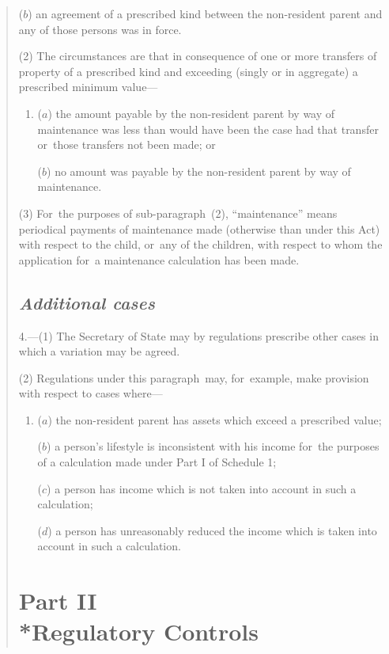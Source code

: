 \documentclass[12pt,a4paper]{article}
\begin{document}
\begin{quotation}
\begin{enumerate}
($b$) an agreement of a prescribed kind between the non-resident parent and any of those persons was in force.
\end{enumerate}

(2) The circumstances are that in consequence of one or more transfers of property of a prescribed kind and exceeding (singly or in aggregate) a prescribed minimum value—
\begin{enumerate}\item[]
($a$) the amount payable by the non-resident parent by way of maintenance was less than would have been the case had that transfer or~those transfers not been made; or

($b$) no amount was payable by the non-resident parent by way of maintenance.
\end{enumerate}

(3) For~the purposes of sub-paragraph~(2), “maintenance” means periodical payments of maintenance made (otherwise than under this Act) with respect to the child, or~any of the children, with respect to whom the application for~a maintenance calculation has been made.

\subsection*{\itshape Additional cases}

4.---(1) The Secretary of State may by regulations prescribe other cases in which a variation may be agreed.

(2) Regulations under this paragraph~may, for~example, make provision with respect to cases where—
\begin{enumerate}\item[]
($a$) the non-resident parent has assets which exceed a prescribed value;

($b$) a person’s lifestyle is inconsistent with his income for~the purposes of a calculation made under Part I of Schedule 1;

($c$) a person has income which is not taken into account in such a calculation;

($d$) a person has unreasonably reduced the income which is taken into account in such a calculation.
\end{enumerate}

\vfill

\section*{Part II\\*Regulatory Controls}


\end{quotation}
\end{document}
